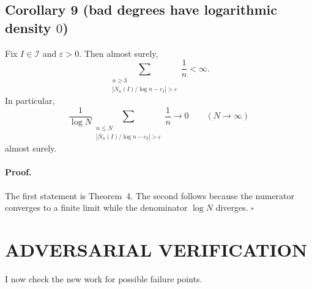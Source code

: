 \subsection*{Corollary 9 (bad degrees have logarithmic density $0$)}
Fix $I\in\mathcal I$ and $\varepsilon>0$. Then almost surely,
\[
\sum_{\substack{n\ge3\\ |N_n(I)/\log n-c_I|>\varepsilon}}\frac1n<\infty.
\]
In particular,
\[
\frac{1}{\log N}
\sum_{\substack{n\le N\\ |N_n(I)/\log n-c_I|>\varepsilon}}\frac1n
\to0
\qquad(N\to\infty)
\]
almost surely.

\paragraph{Proof.}
The first statement is Theorem~4. The second follows because the numerator converges to a finite limit while the denominator $\log N$ diverges.
\hfill$\square$

\section{ADVERSARIAL VERIFICATION}

I now check the new work for possible failure points.

